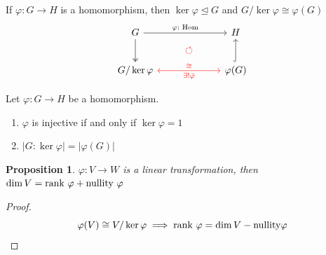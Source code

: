 \documentclass[12pt, a4paper, openany, twoside]{book}
\newtheorem{prop}[thm]{Proposition}
\theoremstyle{definition}
\theoremstyle{remark}
\theoremstyle{plain}
\numberwithin{equation}{section}
\begin{document}
\begin{tcolorbox}[colback=yellow!10!white,colframe=blue!75!black,title=First Isomorphism Theorem]

If $\varphi: G \rightarrow H$ is a homomorphism, then $\ker \varphi \trianglelefteq G$ and $G/\ker \varphi \cong \varphi(G)$
\[
\begin{tikzcd}[row sep=0.5em]
        G \arrow{rr}{\varphi: \text{ Hom}} \arrow[two heads]{dd} & & H \\
        & \mathcolor{red}{\circlearrowleft} & \\
        G/\ker \varphi \arrow[rr, leftrightarrow, red, "\cong", "\exists! \bar{\varphi}"'] & & \varphi(G) \arrow[hook]{uu}
\end{tikzcd}
\]
\end{tcolorbox}

\begin{tcolorbox}[colback=yellow!10!white,colframe=green!75!black,title=Corollary 17]

Let $\varphi: G \rightarrow H$ be a homomorphism. 
\begin{enumerate}
    \item $\varphi$ is injective if and only if $\ker \varphi = 1$
    \item $|G : \ker \varphi| = |\varphi(G)|$
\end{enumerate}

\end{tcolorbox}

\begin{prop}
$\varphi: V \rightarrow W$ is a linear transformation, then $\dim V = {\mathrm{rank}} ~ \varphi + \mathrm{nullity} ~ \varphi$
\end{prop}

\begin{proof}
    
\[\varphi(V) \cong V / \ker \varphi \implies {\mathrm{rank}} ~ \varphi = \dim V - \mathrm{nullity } \varphi\]

\end{proof}
\end{document}
